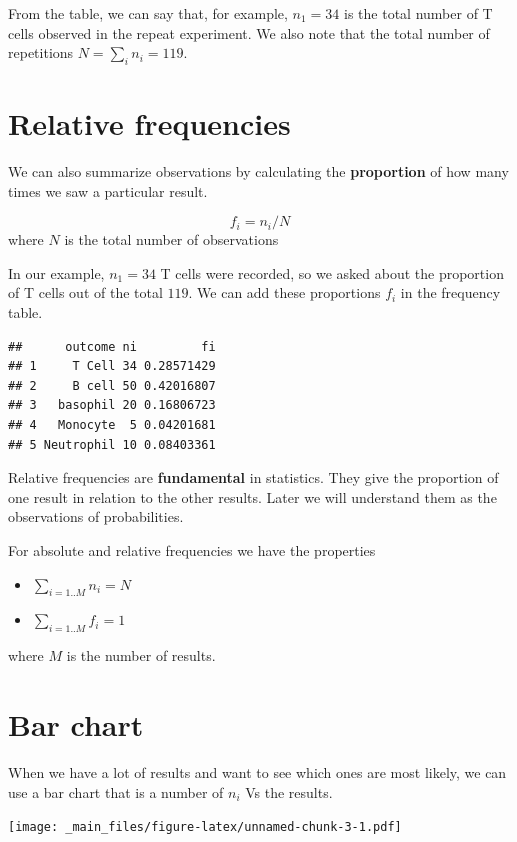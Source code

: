 \documentclass[
]{book}
\providecommand{\tightlist}{%
  \setlength{\itemsep}{0pt}\setlength{\parskip}{0pt}}
\begin{document}
From the table, we can say that, for example, \(n_1=34\) is the total number of T cells observed in the repeat experiment. We also note that the total number of repetitions \(N=\sum_i n_i = 119\).

\hypertarget{relative-frequencies}{%
\section{Relative frequencies}\label{relative-frequencies}}

We can also summarize observations by calculating the \textbf{proportion} of how many times we saw a particular result.

\[ f_i = n_i /N\] where \(N\) is the total number of observations

In our example, \(n_1=34\) T cells were recorded, so we asked about the proportion of T cells out of the total \(119\). We can add these proportions \(f_i\) in the frequency table.

\begin{verbatim}
##      outcome ni         fi
## 1     T Cell 34 0.28571429
## 2     B cell 50 0.42016807
## 3   basophil 20 0.16806723
## 4   Monocyte  5 0.04201681
## 5 Neutrophil 10 0.08403361
\end{verbatim}

Relative frequencies are \textbf{fundamental} in statistics. They give the proportion of one result in relation to the other results. Later we will understand them as the observations of probabilities.

For absolute and relative frequencies we have the properties

\begin{itemize}
\tightlist
\item
  \(\sum_{i=1..M} n_i = N\)
\item
  \(\sum_{i=1..M} f_i = 1\)
\end{itemize}

where \(M\) is the number of results.

\hypertarget{bar-chart}{%
\section{Bar chart}\label{bar-chart}}

When we have a lot of results and want to see which ones are most likely, we can use a bar chart that is a number of \(n_i\) Vs the results.

\texttt{[image: \_main\_files/figure-latex/unnamed-chunk-3-1.pdf]}
\end{document}
